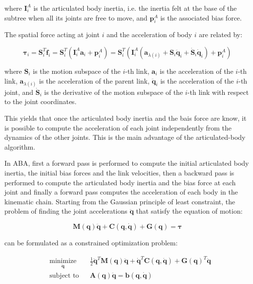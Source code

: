 where $\mathbf{I} _i ^A$ is the articulated body inertia, i.e. the inertia felt at the base of the subtree when all its joints are free to move, and $\mathbf{p} ^A _i$ is the associated bias force.

The spatial force acting at joint $i$ and the acceleration of body $i$ are related by:

\begin{equation}
    \boldsymbol{\tau} _i = \mathbf{S} ^T _i \mathbf{f} _i = \mathbf{S} ^T _i (\mathbf{I} _i ^A \mathbf{a} _i + \mathbf{p} ^A _i) = \mathbf{S} ^T _i (\mathbf{I} _i ^A (\mathbf{a} _{\lambda(i)} + \mathbf{S} _i \ddot{\mathbf{q}} _i + \dot{\mathbf{S}} _i \dot{\mathbf{q}} _i)+ \mathbf{p} ^A _i)
\end{equation}

where $\mathbf{S} _i$ is the motion subspace of the $i$-th link, $\mathbf{a} _i$ is the acceleration of the $i$-th link, $\mathbf{a} _{\lambda(i)}$ is the acceleration of the parent link, $\ddot{\mathbf{q}} _i$ is the acceleration of the $i$-th joint, and $\dot{\mathbf{S}} _i$ is the derivative of the motion subspace of the $i$-th link with respect to the joint coordinates.

This yields that once the articulated body inertia and the bais force are know, it is possible to compute the acceleration of each joint independently from the dynamics of the other joints. This is the main advantage of the articulated-body algorithm.

In ABA, first a forward pass is performed to compute the initial articulated body inertia, the initial bias forces and the link velocities, then a backward pass is performed to compute the articulated body inertia and the bias force at each joint and finally a forward pass computes the acceleration of each body in the kinematic chain.
Starting from the Gaussian principle of least constraint, the problem of finding the joint accelerations $\ddot{\mathbf{q}}$ that satisfy the equation of motion:

\begin{equation}
    \mathbf{M} (\mathbf{q}) \ddot{\mathbf{q}} + \mathbf{C} (\mathbf{q}, \dot{\mathbf{q}}) + \mathbf{G} (\mathbf{q}) = \boldsymbol{\tau}
\end{equation}

can be formulated as a constrained optimization problem:

\begin{equation}
    \begin{aligned}
         & \underset{\ddot{\mathbf{q}}}{\text{minimize}}
         &                                               & \frac{1}{2} \ddot{\mathbf{q}} ^T \mathbf{M} (\mathbf{q}) \ddot{\mathbf{q}} + \dot{\mathbf{q}} ^T \mathbf{C} (\mathbf{q}, \dot{\mathbf{q}}) + \mathbf{G} (\mathbf{q}) ^T \ddot{\mathbf{q}} \\
         & \text{subject to}
         &                                               & \mathbf{A} (\mathbf{q}) \ddot{\mathbf{q}} = \mathbf{b} (\mathbf{q}, \dot{\mathbf{q}})
    \end{aligned}
\end{equation}

